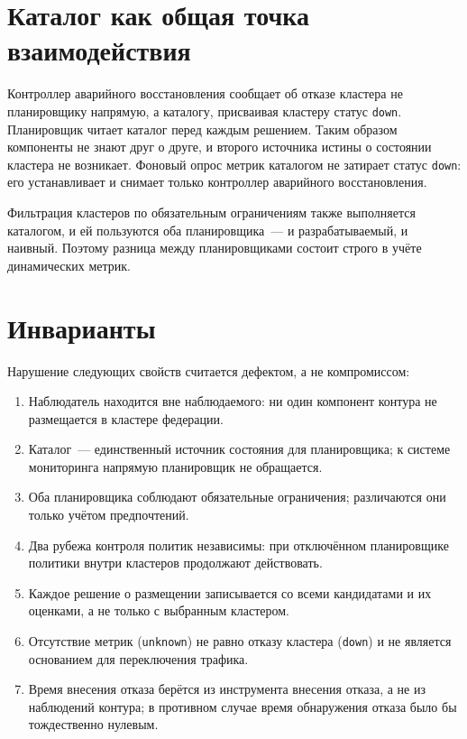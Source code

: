 \section{Каталог как общая точка взаимодействия}

Контроллер аварийного восстановления сообщает об отказе кластера не
планировщику напрямую, а каталогу, присваивая кластеру статус
\texttt{down}. Планировщик читает каталог перед каждым решением. Таким
образом компоненты не знают друг о друге, и второго источника истины о
состоянии кластера не возникает. Фоновый опрос метрик каталогом не
затирает статус \texttt{down}: его устанавливает и снимает только
контроллер аварийного восстановления.

Фильтрация кластеров по обязательным ограничениям также выполняется
каталогом, и ей пользуются оба планировщика~--- и разрабатываемый, и
наивный. Поэтому разница между планировщиками состоит строго в учёте
динамических метрик.

\section{Инварианты}

Нарушение следующих свойств считается дефектом, а не компромиссом:
\begin{enumerate}
  \item Наблюдатель находится вне наблюдаемого: ни один компонент контура не
        размещается в кластере федерации.
  \item Каталог~--- единственный источник состояния для планировщика; к
        системе мониторинга напрямую планировщик не обращается.
  \item Оба планировщика соблюдают обязательные ограничения; различаются
        они только учётом предпочтений.
  \item Два рубежа контроля политик независимы: при отключённом
        планировщике политики внутри кластеров продолжают действовать.
  \item Каждое решение о размещении записывается со всеми кандидатами и их
        оценками, а не только с выбранным кластером.
  \item Отсутствие метрик (\texttt{unknown}) не равно отказу кластера
        (\texttt{down}) и не является основанием для переключения трафика.
  \item Время внесения отказа берётся из инструмента внесения отказа, а не
        из наблюдений контура; в противном случае время обнаружения отказа
        было бы тождественно нулевым.
\end{enumerate}

